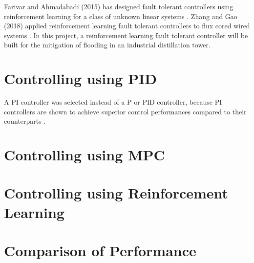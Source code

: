 Farivar and Ahmadabadi (2015) has designed fault tolerant controllers using reinforcement learning for a class of unknown linear systems \cite{ahmad}.  Zhang and Gao (2018) applied reinforcement learning fault tolerant controllers to flux cored wired systems \cite{zhang_gao}.  In this project, a reinforcement learning fault tolerant controller will be built for the mitigation of flooding in an industrial distillation tower. 

\section{Controlling using PID}
A PI controller was selected instead of a P or PID controller, because PI controllers are shown to achieve superior control performances compared to their counterparts \cite{PI_controller}.

\section{Controlling using MPC}
\section{Controlling using Reinforcement Learning}
\section{Comparison of Performance}